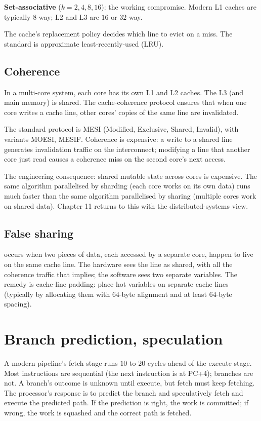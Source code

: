 \textbf{Set-associative} ($k = 2, 4, 8, 16$): the working compromise. Modern L1 caches are typically $8$-way; L2 and L3 are $16$ or $32$-way.

The cache's replacement policy decides which line to evict on a miss. The standard is approximate least-recently-used (LRU).

\subsection{Coherence}

In a multi-core system, each core has its own L1 and L2 caches. The L3 (and main memory) is shared. The cache-coherence protocol ensures that when one core writes a cache line, other cores' copies of the same line are invalidated.

The standard protocol is MESI (Modified, Exclusive, Shared, Invalid), with variants MOESI, MESIF. Coherence is expensive: a write to a shared line generates invalidation traffic on the interconnect; modifying a line that another core just read causes a coherence miss on the second core's next access.

The engineering consequence: shared mutable state across cores is expensive. The same algorithm parallelised by sharding (each core works on its own data) runs much faster than the same algorithm parallelised by sharing (multiple cores work on shared data). Chapter 11 returns to this with the distributed-systems view.

\subsection{False sharing}

 occurs when two pieces of data, each accessed by a separate core, happen to live on the same cache line. The hardware sees the line as shared, with all the coherence traffic that implies; the software sees two separate variables. The remedy is cache-line padding: place hot variables on separate cache lines (typically by allocating them with $64$-byte alignment and at least $64$-byte spacing).

\section{Branch prediction, speculation}

A modern pipeline's fetch stage runs $10$ to $20$ cycles ahead of the execute stage. Most instructions are sequential (the next instruction is at PC+4); branches are not. A branch's outcome is unknown until execute, but fetch must keep fetching. The processor's response is to predict the branch and speculatively fetch and execute the predicted path. If the prediction is right, the work is committed; if wrong, the work is squashed and the correct path is fetched.

